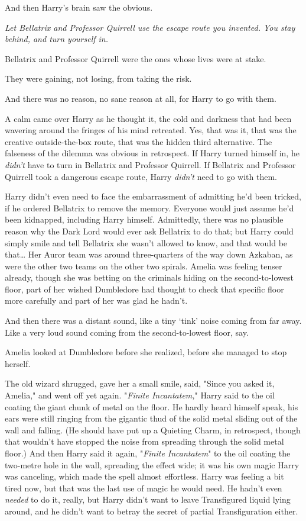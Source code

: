 And then Harry's brain saw the obvious.

\emph{Let Bellatrix and Professor Quirrell use the escape route you invented.
You stay behind, and turn yourself in.}

Bellatrix and Professor Quirrell were the ones whose lives were at stake.

They were gaining, not losing, from taking the risk.

And there was no reason, no sane reason at all, for Harry to go with them.

A calm came over Harry as he thought it, the cold and darkness that had been
wavering around the fringes of his mind retreated. Yes, that was it, that was
the creative outside-the-box route, that was the hidden third alternative. The
falseness of the dilemma was obvious in retrospect. If Harry turned himself in,
he \emph{didn't} have to turn in Bellatrix and Professor Quirrell. If Bellatrix
and Professor Quirrell took a dangerous escape route, Harry \emph{didn't} need
to go with them.

Harry didn't even need to face the embarrassment of admitting he'd been
tricked, if he ordered Bellatrix to remove the memory. Everyone would just
assume he'd been kidnapped, including Harry himself. Admittedly, there was no
plausible reason why the Dark Lord would ever ask Bellatrix to do that; but
Harry could simply smile and tell Bellatrix she wasn't allowed to know, and
that would be that{\ldots}
\later
Her Auror team was around three-quarters of the way down Azkaban, as were
the other two teams on the other two spirals. Amelia was feeling tenser
already, though she was betting on the criminals hiding on the second-to-lowest
floor, part of her wished Dumbledore had thought to check that specific floor
more carefully and part of her was glad he hadn't.

And then there was a distant sound, like a tiny `tink' noise coming from far
away. Like a very loud sound coming from the second-to-lowest floor, say.

Amelia looked at Dumbledore before she realized, before she managed to stop
herself.

The old wizard shrugged, gave her a small smile, said, "Since you asked it,
Amelia," and went off yet again.
\later
"\emph{Finite Incantatem,}" Harry said to the oil coating the giant chunk of
metal on the floor. He hardly heard himself speak, his ears were still ringing
from the gigantic thud of the solid metal sliding out of the wall and falling.
(He should have put up a Quieting Charm, in retrospect, though that wouldn't
have stopped the noise from spreading through the solid metal floor.) And then
Harry said it again, "\emph{Finite Incantatem}" to the oil coating the
two-metre hole in the wall, spreading the effect wide; it was his own magic
Harry was canceling, which made the spell almost effortless. Harry was feeling
a bit tired now, but that was the last use of magic he would need. He hadn't
even \emph{needed} to do it, really, but Harry didn't want to leave
Transfigured liquid lying around, and he didn't want to betray the secret of
partial Transfiguration either.

